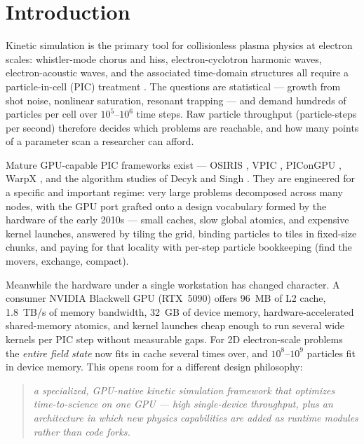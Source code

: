 \documentclass[11pt]{article}
\begin{document}
\tableofcontents

\section{Introduction}
\label{sec:intro}

Kinetic simulation is the primary tool for collisionless plasma physics
at electron scales: whistler-mode chorus and hiss, electron-cyclotron
harmonic waves, electron-acoustic waves, and the associated time-domain
structures all require a particle-in-cell (PIC) treatment
\cite{birdsall-langdon,omura2021}. The questions are statistical ---
growth from shot noise, nonlinear saturation, resonant trapping --- and
demand hundreds of particles per cell over $10^5$--$10^6$ time steps.
Raw particle throughput (particle-steps per second) therefore decides
which problems are reachable, and how many points of a parameter scan a
researcher can afford.

Mature GPU-capable PIC frameworks exist --- OSIRIS \cite{fonseca2002},
VPIC \cite{bowers2008}, PIConGPU \cite{bussmann2013}, WarpX
\cite{fedeli2022}, and the algorithm studies of Decyk and Singh
\cite{decyk2014}. They are engineered for a specific and important
regime: very large problems decomposed across many nodes, with the GPU
port grafted onto a design vocabulary formed by the hardware of the
early 2010s --- small caches, slow global atomics, and expensive kernel
launches, answered by tiling the grid, binding particles to tiles in
fixed-size chunks, and paying for that locality with per-step particle
bookkeeping (find the movers, exchange, compact).

Meanwhile the hardware under a single workstation has changed character.
A consumer NVIDIA Blackwell GPU (RTX~5090) offers \SI{96}{MB} of L2
cache, \SI{1.8}{TB/s} of memory bandwidth, \SI{32}{GB} of device memory,
hardware-accelerated shared-memory atomics, and kernel launches cheap
enough to run several wide kernels per PIC step without measurable gaps.
For 2D electron-scale problems the \emph{entire field state} now fits in
cache several times over, and $10^8$--$10^9$ particles fit in device
memory. This opens room for a different design philosophy:

\begin{quote}
\emph{a specialized, GPU-native kinetic simulation framework that
optimizes time-to-science on one GPU --- high single-device throughput,
plus an architecture in which new physics capabilities are added as
runtime modules rather than code forks.}
\end{quote}
\end{document}
